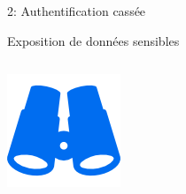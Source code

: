 \documentclass[final,hyperref={pdfpagelabels=false}]{beamer}
\begin{document}
\begin{frame}[t]
\begin{columns}[t]
\begin{column}{.465\textwidth}
\begin{block}{2: Authentification cassée}
\end{block}


\begin{block}{Exposition de données sensibles}
	\begin{columns}[T]

		\begin{column}{.125\textwidth} %
			\includegraphics[scale=1.35]{binoculars.png}
		\end{column}


\end{columns}
\end{block}
\end{column}
\end{columns}
\end{frame}
\end{document}
